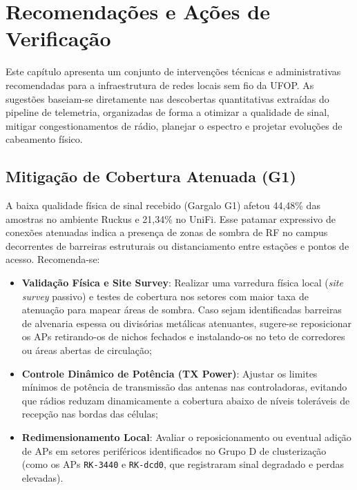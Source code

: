 \chapter{Recomendações e Ações de Verificação}
\label{cap:recomendacoes}

Este capítulo apresenta um conjunto de intervenções técnicas e administrativas recomendadas para a infraestrutura de redes locais sem fio da UFOP. As sugestões baseiam-se diretamente nas descobertas quantitativas extraídas do pipeline de telemetria, organizadas de forma a otimizar a qualidade de sinal, mitigar congestionamentos de rádio, planejar o espectro e projetar evoluções de cabeamento físico.

\section{Mitigação de Cobertura Atenuada (G1)}
\label{sec:recomendacoes_g1}

A baixa qualidade física de sinal recebido (Gargalo G1) afetou 44,48\% das amostras no ambiente Ruckus e 21,34\% no UniFi. Esse patamar expressivo de conexões atenuadas indica a presença de zonas de sombra de RF no campus decorrentes de barreiras estruturais ou distanciamento entre estações e pontos de acesso. Recomenda-se:
\begin{itemize}
	\item \textbf{Validação Física e Site Survey}: Realizar uma varredura física local (\textit{site survey} passivo) e testes de cobertura nos setores com maior taxa de atenuação para mapear áreas de sombra. Caso sejam identificadas barreiras de alvenaria espessa ou divisórias metálicas atenuantes, sugere-se reposicionar os APs retirando-os de nichos fechados e instalando-os no teto de corredores ou áreas abertas de circulação;
	\item \textbf{Controle Dinâmico de Potência (TX Power)}: Ajustar os limites mínimos de potência de transmissão das antenas nas controladoras, evitando que rádios reduzam dinamicamente a cobertura abaixo de níveis toleráveis de recepção nas bordas das células;
	\item \textbf{Redimensionamento Local}: Avaliar o reposicionamento ou eventual adição de APs em setores periféricos identificados no Grupo D de clusterização (como os APs \texttt{RK-3440} e \texttt{RK-dcd0}, que registraram sinal degradado e perdas elevadas).
\end{itemize}

